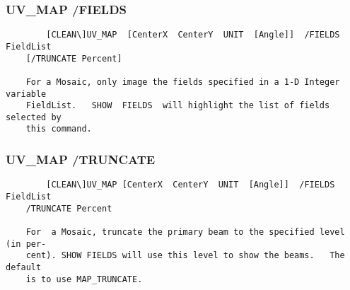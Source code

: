 \subsubsection{UV\_MAP /FIELDS}
\begin{verbatim}
        [CLEAN\]UV_MAP  [CenterX  CenterY  UNIT  [Angle]]  /FIELDS FieldList
    [/TRUNCATE Percent]

    For a Mosaic, only image the fields specified in a 1-D Integer  variable
    FieldList.   SHOW  FIELDS  will highlight the list of fields selected by
    this command.

\end{verbatim}
\subsubsection{UV\_MAP /TRUNCATE}
\begin{verbatim}
        [CLEAN\]UV_MAP [CenterX  CenterY  UNIT  [Angle]]  /FIELDS  FieldList
    /TRUNCATE Percent

    For  a Mosaic, truncate the primary beam to the specified level (in per-
    cent). SHOW FIELDS will use this level to show the beams.   The  default
    is to use MAP_TRUNCATE.

\end{verbatim}
